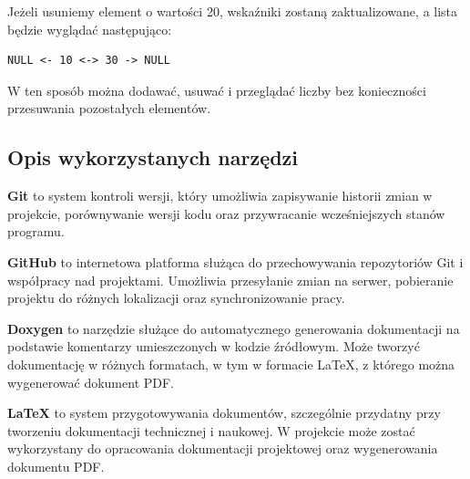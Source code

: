 Jeżeli usuniemy element o wartości 20, wskaźniki zostaną zaktualizowane, a lista będzie wyglądać następująco:
\begin{verbatim}
NULL <- 10 <-> 30 -> NULL
\end{verbatim}

W ten sposób można dodawać, usuwać i przeglądać liczby bez konieczności przesuwania pozostałych elementów.

\subsection{Opis wykorzystanych narzędzi}
\textbf{Git} to system kontroli wersji, który umożliwia zapisywanie historii zmian w projekcie, porównywanie wersji kodu oraz przywracanie wcześniejszych stanów programu.

\textbf{GitHub} to internetowa platforma służąca do przechowywania repozytoriów Git i współpracy nad projektami. Umożliwia przesyłanie zmian na serwer, pobieranie projektu do różnych lokalizacji oraz synchronizowanie pracy.

\textbf{Doxygen} to narzędzie służące do automatycznego generowania dokumentacji na podstawie komentarzy umieszczonych w kodzie źródłowym. Może tworzyć dokumentację w różnych formatach, w tym w formacie LaTeX, z którego można wygenerować dokument PDF.

\textbf{LaTeX} to system przygotowywania dokumentów, szczególnie przydatny przy tworzeniu dokumentacji technicznej i naukowej. W projekcie może zostać wykorzystany do opracowania dokumentacji projektowej oraz wygenerowania dokumentu PDF.